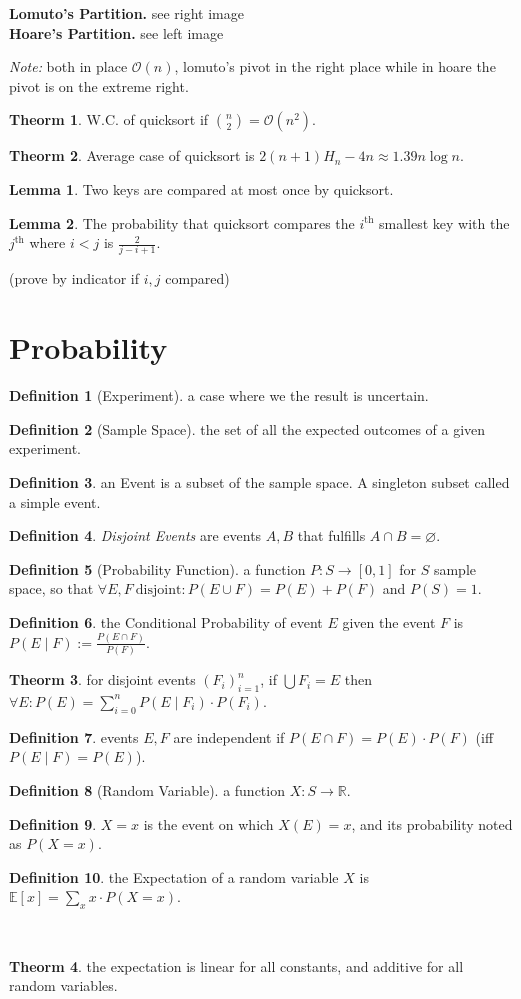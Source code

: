 \documentclass[]{article}
\newcommand\compactsection   [1]        {\vspace{-10pt}\section{#1}\vspace{-5pt}}
\theoremstyle{definition}
\newtheorem{Theorem}{\color{theoColor}Theorm}
\newtheorem{Definition}{\color{defiColor}Definition}
\newtheorem{Lemma}{\color{lemColor}Lemma}
\newcommand\theo  [1] {\begin{Theorem}#1\end{Theorem}}
\newcommand\defi  [1] {\begin{Definition}#1\end{Definition}}
\newcommand\lem   [1] {\begin{Lemma}#1\end{Lemma}}
\newcommand\R     {\mathbb{R}}
\newcommand\E     {\mathbb{E}}
\newcommand\oc    {\mathcal{O}}
\newcommand\sumni     {\sum_{i = 0}^{n}}
\newcommand\co        {\colon}
\newcommand\logn      {\log n}
\begin{document}
\begin{multicols}{4}
				\textbf{Lomuto's Partition. } see right image \\
				\textbf{Hoare's Partition. } see left image
				
				\textit{Note: }both in place $\oc(n)$, lomuto's pivot in the right place while in hoare the pivot is on the extreme right. 
				
				\theo{W.C. of quicksort if $\binom{n}{2} = \oc(n^2)$. }
				\theo{Average case of quicksort is $2(n + 1)H_n - 4n \approx 1.39n\logn$. }
				\lem{Two keys are compared at most once by quicksort. }
				\lem{The probability that quicksort compares the $i^{\text{th}}$ smallest key with the $j^{\text{th}}$ where $i< j$ is $\frac{2}{j - i + 1}$. }
				(prove by indicator if $i, j$ compared)
		
		\compactsection{Probability}
			\begin{Definition}[Experiment]
				a case where we the result is uncertain. 
			\end{Definition}
			\begin{Definition}[Sample Space]
				the set of all the expected outcomes of a given experiment. 
			\end{Definition}
			\defi{an \color{defiColor}Event\color{black} is a subset of the sample space. A singleton subset called a \color{defiColor}simple event\color{black}. }
			\defi{\textit{Disjoint Events} are events $A, B$ that fulfills $A \cap B = \varnothing$. }
			\begin{Definition}[Probability Function]
				a function $P \co S \to [0, 1]$ for $S$ sample space, so that $\forall E, F \ \text{disjoint} \co P(E \cup F) = P(E) + P(F)$ and $P(S) = 1$.
			\end{Definition}
			\defi{the \color{defiColor}Conditional Probability\color{black} of event $E$ given the event $F$ is $P(E \mid F) := \frac{P(E \cap F)}{P(F)}$. }
			\theo{for disjoint events $(F_i)_{i = 1}^{n}$, if $\bigcup F_i = E $ then $\forall E \co P(E) = \sumni P(E \mid F_i) \cdot P(F_i)$. }
			\defi{events $E, F$ are independent if $P(E \cap F) = P(E) \cdot P(F)$ (iff $P(E \mid F) = P(E)$). }
			\begin{Definition}[Random Variable]
				a function $X \co S \to \R$. 
			\end{Definition}
			\defi{\color{defiColor}$X = x$\color{black} is the event on which $X(E) = x$, and its probability noted as $P(X = x)$. }
			\defi{the \color{defiColor}Expectation\color{black} of a random variable $X$ is $\E[x] = \sum_{x} x \cdot P(X = x)$. }\
			\theo{the expectation is linear for all constants, and additive for all random variables. }

\end{multicols}
\end{document}
